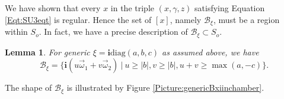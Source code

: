 \documentclass[12pt]{amsart}
\newtheorem{lemma}[theorem]{Lemma}
\theoremstyle{definition}
\numberwithin{equation}{section}
\def\diag{\mathrm{diag}}
\newcommand{\abs}[1]{\lvert#1\rvert}
\newcommand{\imagunit}{\mathbf{i}}
\newcommand{\SET}[1]{\{#1\}}
\newcommand{\Bxi}{\mathcal{B}_{\xi}}
\begin{document}
We have shown that every $x$ in the triple $(x, \gamma, z)$ satisfying Equation \eqref{Eqt:SU3eqt} is regular. Hence   the set of $[x]$, namely $  \Bxi $,  must be a region within $S_o$. In fact, we have a precise description of   $\Bxi \subset S_o$.

\begin{lemma}\label{Lemma:genericBxishape} For generic $\xi= \imagunit  \diag(a  , b  , c  )$  as assumed above, we have
\begin{equation}\label{Eqt:Bxi2uvuplusv}
\Bxi =\SET{\imagunit ( u\vec{\omega}_1+v\vec{\omega}_2)~|~ u\geqslant {\abs{b}} ,v\geqslant {\abs{b}} ,u+v\geqslant \max(a,-c)}.
\end{equation}

\end{lemma}
The shape of $\Bxi $ is illustrated by Figure \ref{Picture:genericBxiinchamber}. 
 
\end{document}

